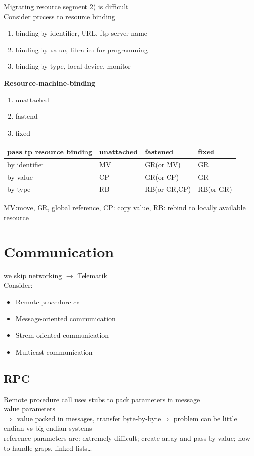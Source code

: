\documentclass[ngerman,a4paper]{report}
\begin{document}

Migrating resource segment 2) is difficult\\
Consider process to resource binding\\
\begin{enumerate}
	\item binding by identifier, URL, ftp-server-name
	\item binding by value, libraries for programming
	\item binding by type, local device, monitor
\end{enumerate}

\textbf{Resource-machine-binding}
\begin{enumerate}
	\item unattached
	\item fastend
	\item fixed
\end{enumerate}

\begin{tabular}{l| l| l| l}
pass tp resource binding&unattached&fastened&fixed\\
\hline
by identifier& MV&GR(or MV)& GR\\
\hline
by value& CP& GR(or CP)& GR\\
\hline
by type& RB&RB(or GR,CP)&RB(or GR)\\
\end{tabular}
MV:move, GR, global reference, CP: copy value, RB: rebind to locally available resource

\section{Communication}
we skip networking $\rightarrow$ Telematik\\

Consider:\\
\begin{itemize}
	\item Remote procedure call
	\item Message-oriented communication
	\item Strem-oriented communication
	\item Multicast communication
\end{itemize}

\subsection{RPC}
Remote procedure call uses stubs to pack parameters in message\\
value parameters\\
$\Rightarrow$ value packed in messages, transfer byte-by-byte$\Rightarrow$ problem can be little endian vs big endian systems\\
reference parameters are: extremely difficult; create array and pass by value; how to handle graps, linked lists\ldots\\
\end{document}

